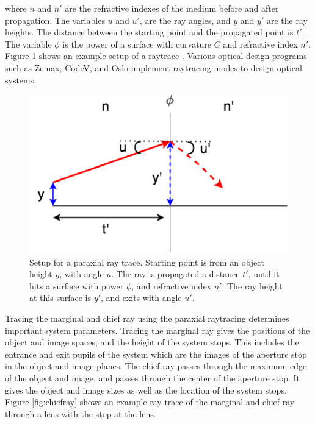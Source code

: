 where $n$ and $n'$ are the refractive indexes of the medium before and after propagation. The variables $u$ and $u'$, are the ray angles, and $y$ and $y'$ are the ray heights. The distance between the starting point and the propagated point is $t'$. The variable $\phi$ is the power of a surface with curvature $C$ and refractive index $n'$. Figure \ref{fig:paraxial} shows an example setup of a raytrace \citep{greivenkamp2004field}. Various optical design programs such as Zemax, CodeV, and Oslo implement raytracing modes to design optical systems. 


\begin{figure}
    \centering
    \includegraphics[width=.5\textwidth]{Chapter Materials/Chapter Three Materials/paraxialray.png}
    \caption{Setup for a paraxial ray trace. Starting point is from an object height $y$, with angle $u$. The ray is propagated a distance $t'$, until it hits a surface with power $\phi$, and refractive index $n'$. The ray height at this surface is $y'$, and exits with angle $u'$.}
    \label{fig:paraxial}
\end{figure}




Tracing the marginal and chief ray using the paraxial raytracing determines important system parameters. Tracing the marginal ray gives the positions of the object and image spaces, and the height of the system stops. This includes the entrance and exit pupils of the system which are the images of the aperture stop in the object and image planes. The chief ray passes through the maximum edge of the object and image, and passes through the center of the aperture stop. It gives the object and image sizes as well as the location of the system stops. Figure \ref{fig:chiefray} shows an example ray trace of the marginal and chief ray through a lens with the stop at the lens. 


